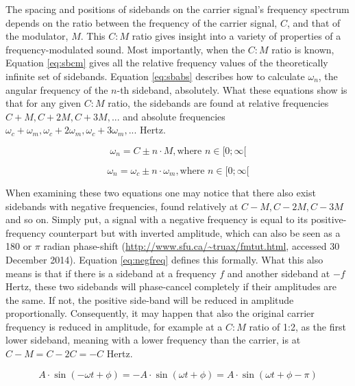   The spacing and positions of sidebands on the carrier signal's frequency spectrum depends on the ratio between the frequency of the carrier signal, $C$, and that of the modulator, $M$. This $C:M$ ratio gives insight into a variety of properties of a frequency-modulated sound. Most importantly, when the $C:M$ ratio is known, Equation \ref{eq:sbcm} gives all the relative frequency values of the theoretically infinite set of sidebands. Equation \ref{eq:sbabs} describes how to calculate $\omega_{n}$, the angular frequency of the $n$-th sideband, absolutely. What these equations show is that for any given $C:M$ ratio, the sidebands are found at relative frequencies $C + M, C + 2M, C + 3M, ... $ and absolute frequencies %
  $\omega_{c} + \omega_{m}, \omega_{c} + 2 \omega_{m},\omega_{c} + 3 \omega_{m}, ...$ Hertz. \parbreak

  \begin{equation}
    \omega_{n} = C \pm n \cdot M, \text{where } n \in [0;\infty[
    \label{eq:sbcm}
  \end{equation}

  \begin{equation}
    \omega_{n} = \omega_{c} \pm n \cdot \omega_{m}, \text{where } n \in [0;\infty[
    \label{eq:sbabs}
  \end{equation}

When examining these two equations one may notice that there also exist sidebands with negative frequencies, found relatively at $C - M, C - 2M, C - 3M$ and so on. Simply put, a signal with a negative frequency is equal to its positive-frequency counterpart but with inverted amplitude, which can also be seen as a 180\degree{} or $\pi$ radian phase-shift (\url{http://www.sfu.ca/~truax/fmtut.html}, accessed 30 December 2014). Equation \ref{eq:negfreq} defines this formally. What this also means is that if there is a sideband at a frequency $f$ and another sideband at $-f$ Hertz, these two sidebands will phase-cancel completely if their amplitudes are the same. If not, the positive side-band will be reduced in amplitude proportionally. Consequently, it may happen that also the original carrier frequency is reduced in amplitude, for example at a $C:M$ ratio of 1:2, as the first lower sideband, meaning with a lower frequency than the carrier, is at $C - M = C - 2C = -C$ Hertz. \parbreak

\begin{equation}
    A \cdot \sin(-\omega t + \phi) = -A \cdot \sin(\omega t + \phi) = A \cdot \sin(\omega t + \phi - \pi)
    \label{eq:negfreq}
\end{equation}

